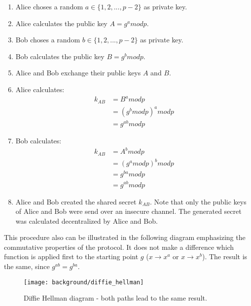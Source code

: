 \begin{enumerate}
\item Alice choses a random $a \in \{1, 2, ... , p-2\}$ as private key. 
\item Alice calculates the public key $A = g^a mod p$.
\item Bob choses a random $b \in \{1, 2, ... , p-2\}$ as private key. 
\item Bob calculates the public key $B = g^b mod p$.
\item Alice and Bob exchange their public keys $A$ and $B$.
\item Alice calculates: 
\begin{equation}
\begin{split}
k_{AB} & = B^a mod p \\
 & = (g^b mod p)^a mod p \\
 & = g^{a b} mod p
\end{split}
\end{equation}
\item Bob calculates: 
\begin{equation}
\begin{split}
k_{AB} & = A^b mod p \\
 & = (g^a mod p)^b mod p \\
 & = g^{b a} mod p \\
 & = g^{a b} mod p
\end{split}
\end{equation}
\item Alice and Bob created the shared secret $k_{AB}$. Note that only the public keys of Alice and Bob were send over an insecure channel. The generated secret was calculated decentralized by Alice and Bob.
\end{enumerate}
This procedure also can be illustrated in the following diagram emphasizing the commutative properties of the protocol. It does not make a difference which function is applied first to the starting point $g$ ($x \to x^a$ or $x \to x^b$). The result is the same, since $g^{ab} = g^{ba}$.

\begin{figure}[htpb]
  \centering
  \texttt{[image: background/diffie\_hellman]}
  \caption[Diffie Hellman diagram]{Diffie Hellman diagram - both paths lead to the same result.}
  \label{fig:diffie_hellman}
\end{figure}

